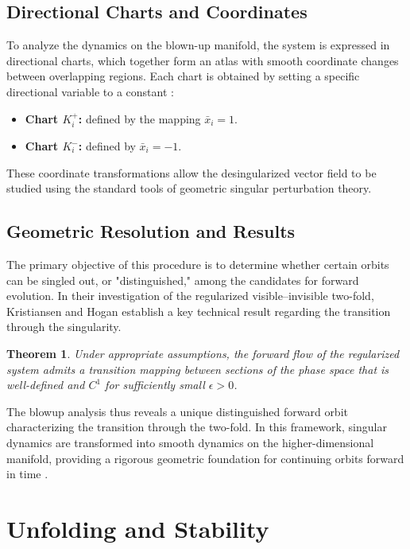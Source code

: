 \documentclass[12pt, a4paper, oneside]{book}
\theoremstyle{plain}
\newtheorem{theorem}{Theorem}[chapter]
\theoremstyle{definition}
\theoremstyle{remark}
\theoremstyle{definition}
\begin{document}
\subsection{Directional Charts and Coordinates}

To analyze the dynamics on the blown-up manifold, the system is expressed in directional charts, which together form an atlas with smooth coordinate changes between overlapping regions. Each chart is obtained by setting a specific directional variable to a constant \cite{kristiansen2019resolution}:

\begin{itemize}
    \item \textbf{Chart $K_i^+$:} defined by the mapping $\bar{x}_i = 1$.
    \item \textbf{Chart $K_i^-$:} defined by $\bar{x}_i = -1$.
\end{itemize}

These coordinate transformations allow the desingularized vector field to be studied using the standard tools of geometric singular perturbation theory.

\subsection{Geometric Resolution and Results}

The primary objective of this procedure is to determine whether certain orbits can be singled out, or "distinguished," among the candidates for forward evolution. In their investigation of the regularized visible--invisible two-fold, Kristiansen and Hogan establish a key technical result regarding the transition through the singularity.

\begin{theorem}
    Under appropriate assumptions, the forward flow of the regularized system admits a transition mapping between sections of the phase space that is well-defined and $C^1$ for sufficiently small $\epsilon > 0$.
\end{theorem} 

The blowup analysis thus reveals a unique distinguished forward orbit characterizing the transition through the two-fold. In this framework, singular dynamics are transformed into smooth dynamics on the higher-dimensional manifold, providing a rigorous geometric foundation for continuing orbits forward in time \cite{kristiansen2019resolution}.

\section{Unfolding and Stability}
\label{sec:unfolding}
\end{document}
